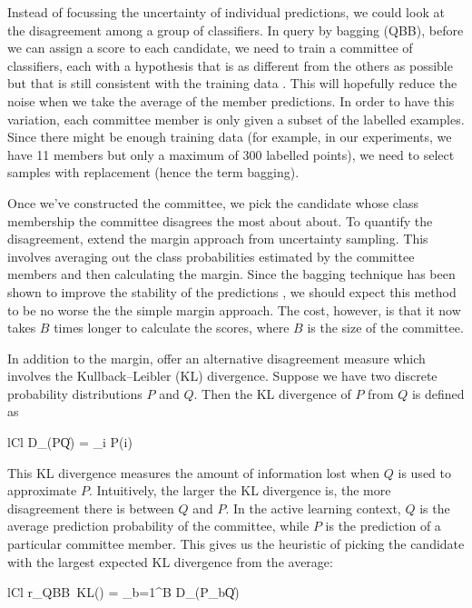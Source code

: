 Instead of focussing the uncertainty of individual predictions, we could look at
the disagreement among a group of classifiers. In query by bagging (QBB), before we
can assign a score to each candidate, we need to train a committee of classifiers, each
with a hypothesis that is as different from the others as possible but that is still consistent
with the training data \cite{melville04}. This will hopefully reduce the noise when
we take the average of the member predictions. In order to have this variation,
each committee member is only given a subset of the labelled examples. Since there
might be enough training data (for example, in our experiments, we have 11 members but only a
maximum of 300 labelled points), we need to select samples with replacement (hence the term bagging).

Once we've constructed the committee, we pick the candidate whose class membership the committee 
disagrees the most about about. To quantify the disagreement,  extend the
margin approach from uncertainty sampling. This involves averaging out the class probabilities estimated
by the committee members and then calculating the margin. Since the bagging technique
has been shown to improve the stability of the predictions \cite{breiman96}, we should
expect this method to be no worse the the simple margin approach. The cost, however, is that
it now takes $B$ times longer to calculate the scores, where $B$ is the size of the 
committee.

In addition to the margin,  offer an alternative disagreement measure which
involves the Kullback–Leibler (KL) divergence. Suppose we have two discrete
probability distributions $P$ and $Q$. Then the KL divergence of $P$ from $Q$ is defined as
	\begin{IEEEeqnarray*}{lCl}
		D_{}(P\|Q) = \sum_i P(i) \, \ln{}
	\end{IEEEeqnarray*}
This KL divergence measures the amount of information lost when $Q$ is used to approximate $P$. Intuitively, the larger the KL divergence is, the more disagreement there is between $Q$ and $P$. In the active learning context, $Q$ is the average prediction probability of the committee, while $P$ is the prediction of a particular committee member.
This gives us the heuristic of picking the candidate with the largest expected KL divergence from the average:
	\begin{IEEEeqnarray*}{lCl}
		r_{QBB~KL}() =  \sum_{b=1}^B D_{}(P_b\|Q)
	\end{IEEEeqnarray*}




